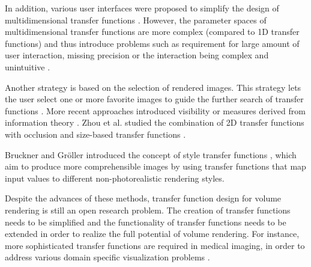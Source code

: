 \documentclass{egpubl}
\begin{document}
In addition, various user interfaces were proposed to simplify the design of multidimensional transfer functions \cite{tzeng_novel_2003} \cite{tzeng_cluster-space_2004}.
However, the parameter spaces of multidimensional transfer functions are more complex (compared to 1D transfer functions) and thus introduce problems such as requirement for large amount of user interaction, missing precision or the interaction being complex and unintuitive \cite{arens_survey_2010}.

Another strategy is based on the selection of rendered images. This strategy lets the user select one or more favorite images to guide the further search of transfer functions \cite{marks_design_1997} \cite{wu_interactive_2007}. More recent approaches introduced visibility \cite{correa_visibility-driven_2009} \cite{correa_visibility_2011} or measures derived from information theory \cite{haidacher_information-based_2008} \cite{bruckner_isosurface_2010} \cite{ruiz_automatic_2011} \cite{bramon_information_2013}. Zhou et al. studied the combination of 2D transfer functions with occlusion and size-based transfer functions \cite{zhou_transfer_2012}.

Bruckner and Gr{\"o}ller introduced the concept of style transfer functions \cite{bruckner_style_2007}, which aim to produce more comprehensible images by using transfer functions that map input values to different non-photorealistic rendering styles.

Despite the advances of these methods, transfer function design for volume rendering is still an open research problem.
The creation of transfer functions needs to be simplified and the functionality of transfer functions needs to be extended in order to realize the full potential of volume rendering. For instance, more sophisticated transfer functions are required in medical imaging, in order to address various domain specific visualization problems \cite{lindholm_spatial_2010}.
\end{document}

